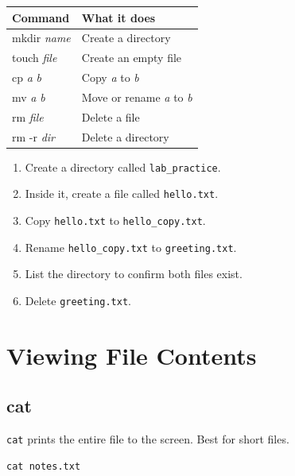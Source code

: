 \documentclass[12pt,a4paper]{article}
\newcommand{\exercise}[1]{%
  \begin{tcolorbox}[exercisestyle]
    #1
  \end{tcolorbox}
}
\newcommand{\cmd}[1]{\texttt{\textcolor{kugreen!70!black}{#1}}}
\begin{document}
\begin{center}
\begin{tabular}{>{\ttfamily}lp{8cm}}
\toprule
\normalfont\textbf{Command} & \textbf{What it does} \\
\midrule
mkdir \textit{name}   & Create a directory \\
touch \textit{file}   & Create an empty file \\
cp \textit{a} \textit{b}    & Copy \textit{a} to \textit{b} \\
mv \textit{a} \textit{b}    & Move or rename \textit{a} to \textit{b} \\
rm \textit{file}      & Delete a file \\
rm -r \textit{dir}    & Delete a directory \\
\bottomrule
\end{tabular}
\end{center}

\exercise{
  \begin{enumerate}[noitemsep]
    \item Create a directory called \texttt{lab\_practice}.
    \item Inside it, create a file called \texttt{hello.txt}.
    \item Copy \texttt{hello.txt} to \texttt{hello\_copy.txt}.
    \item Rename \texttt{hello\_copy.txt} to \texttt{greeting.txt}.
    \item List the directory to confirm both files exist.
    \item Delete \texttt{greeting.txt}.
  \end{enumerate}
}

\section{Viewing File Contents}

\subsection{cat}

\cmd{cat} prints the entire file to the screen. Best for short files.

\begin{lstlisting}[style=bash]
cat notes.txt
\end{lstlisting}
\end{document}
